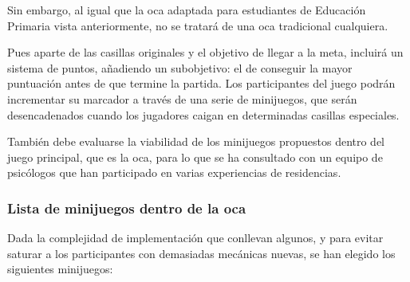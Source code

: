 Sin embargo, al igual que la oca adaptada para estudiantes de Educación Primaria vista anteriormente, no se tratará de una oca tradicional cualquiera. 

Pues aparte de las casillas originales y el objetivo de llegar a la meta, incluirá un sistema de puntos, añadiendo un subobjetivo: el de conseguir la mayor puntuación antes de que termine la partida. Los participantes del juego podrán incrementar su marcador a través de una serie de minijuegos, que serán desencadenados cuando los jugadores caigan en determinadas casillas especiales.

También debe evaluarse la viabilidad de los minijuegos propuestos dentro del juego principal, que es la oca, para lo que se ha consultado con un equipo de psicólogos que han participado en varias experiencias de residencias.

\subsubsection{Lista de minijuegos dentro de la oca}
Dada la complejidad de implementación que conllevan algunos, y para evitar saturar a los participantes con demasiadas mecánicas nuevas, se han elegido los siguientes minijuegos:

